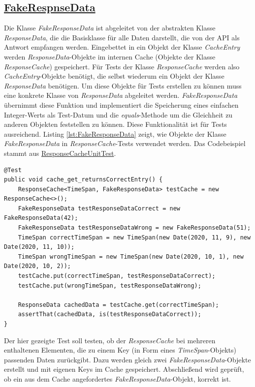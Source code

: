 \documentclass[12pt]{article}
\begin{document}
\newpage
\subsection*{\href{https://github.com/lukaspanni/OpenSourceStats/blob/main/app/src/test/java/de/lukaspanni/opensourcestats/mock/FakeResponseData.java}{FakeRespnseData}}
Die Klasse \textit{FakeResponseData} ist abgeleitet von der abstrakten Klasse \textit{ResponseData}, die die Basisklasse für alle Daten darstellt, die von der API als Antwort empfangen werden. Eingebettet in ein Objekt der Klasse \textit{CacheEntry} werden \textit{ResponseData}-Objekte im internen Cache (Objekte der Klasse \textit{ResponseCache}) gespeichert.
\newline
Für Tests der Klasse \textit{ResponseCache} werden also \textit{CacheEntry}-Objekte benötigt, die selbst wiederum ein Objekt der Klasse \textit{ResponseData} benötigen.
Um diese Objekte für Tests erstellen zu können muss eine  konkrete Klasse von \textit{ResponseData} abgeleitet werden. \textit{FakeResponseData} übernimmt diese Funktion und implementiert die Speicherung eines einfachen Integer-Werts als Test-Datum und die \textit{equals}-Methode um die Gleichheit zu anderen Objekten feststellen zu können.
Diese Funktionalität ist für Tests ausreichend.
\newline
Listing \ref{lst:FakeResponseData} zeigt, wie Objekte der Klasse \textit{FakeResponseData} in \textit{ResponseCache}-Tests verwendet werden. Das Codebeispiel stammt aus \href{https://github.com/lukaspanni/OpenSourceStats/blob/d0f67e73e4692b70316216688b7f556f42ccc11e/app/src/test/java/de/lukaspanni/opensourcestats/ResponseCacheUnitTest.java#L20-L32}{ResponseCacheUnitTest}.
\begin{lstlisting}[caption={Beispielhafte Verwendung von FakeResponseData}, label={lst:FakeResponseData}, captionpos={b}]
@Test
public void cache_get_returnsCorrectEntry() {
    ResponseCache<TimeSpan, FakeResponseData> testCache = new ResponseCache<>();
    FakeResponseData testResponseDataCorrect = new FakeResponseData(42);
    FakeResponseData testResponseDataWrong = new FakeResponseData(51);
    TimeSpan correctTimeSpan = new TimeSpan(new Date(2020, 11, 9), new Date(2020, 11, 10));
    TimeSpan wrongTimeSpan = new TimeSpan(new Date(2020, 10, 1), new Date(2020, 10, 2));
    testCache.put(correctTimeSpan, testResponseDataCorrect);
    testCache.put(wrongTimeSpan, testResponseDataWrong);

    ResponseData cachedData = testCache.get(correctTimeSpan);
    assertThat(cachedData, is(testResponseDataCorrect));
}
\end{lstlisting}
Der hier gezeigte Test soll testen, ob der \textit{ResponseCache} bei mehreren enthaltenen Elementen, die zu einem Key (in Form eines \textit{TimeSpan}-Objekts) passenden Daten zurückgibt.
Dazu werden gleich zwei \textit{FakeResponseData}-Objekte erstellt und mit eigenen Keys im Cache gespeichert. Abschließend wird geprüft, ob ein aus dem Cache angefordertes \textit{FakeResponseData}-Objekt, korrekt ist.
\end{document}
